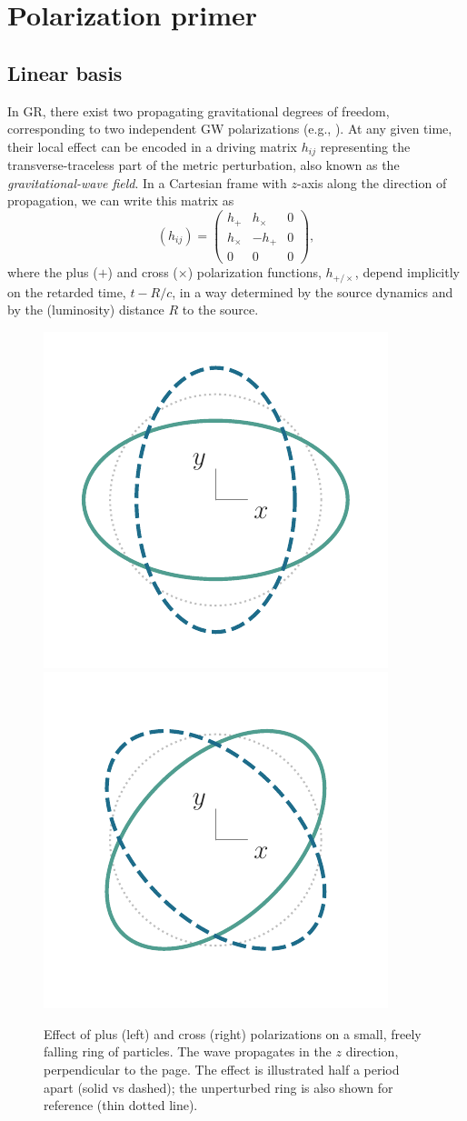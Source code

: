 \documentclass[aps,prd,twocolumn,superscriptaddress,preprintnumbers,floatfix,nofootinbib]{revtex4-2}
\newcommand{\beq}{\begin{equation}}
\newcommand{\eeq}{\end{equation}}
\begin{document}
\section{Polarization primer}

\subsection{Linear basis}

In GR, there exist two propagating gravitational degrees of freedom, corresponding to two independent GW polarizations (e.g., \cite{Thorne1983,Thorne:1987af,Poisson2014,BT}).
At any given time, their local effect can be encoded in a driving matrix $h_{ij}$ representing the transverse-traceless part of the metric perturbation, also known as the \emph{gravitational-wave field}.
In a Cartesian frame with $z$-axis along the direction of propagation, we can write this matrix as
\beq \label{eq:hij}
(h_{ij}) = \begin{pmatrix}
h_+ & h_\times  & 0 \\
h_\times  & - h_+ & 0  \\
0 & 0 & 0
\end{pmatrix} ,
\eeq
where the plus ($+$) and cross ($\times$) polarization functions, $h_{+/\times}$, depend implicitly on the retarded time, $t - R/c$, in a way determined by the source dynamics and by the (luminosity) distance $R$ to the source.

\begin{figure}
\includegraphics[width=0.4\columnwidth]{pol_ring_plus}
\includegraphics[width=0.4\columnwidth]{pol_ring_cross}
\caption{Effect of plus (left) and cross (right) polarizations on a small, freely falling ring of particles. The wave propagates in the $z$ direction, perpendicular to the page. The effect is illustrated half a period apart (solid vs dashed); the unperturbed ring is also shown for reference (thin dotted line).
}
\label{fig:rings}
\end{figure}
\end{document}
